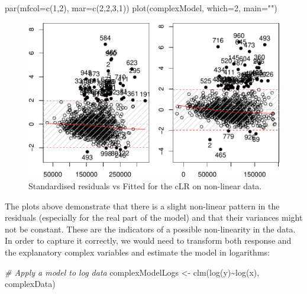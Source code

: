 \documentclass[
]{book}
\newenvironment{Shaded}{\begin{snugshade}}{\end{snugshade}}
\newcommand{\AttributeTok}[1]{\textcolor[rgb]{0.77,0.63,0.00}{#1}}
\newcommand{\CommentTok}[1]{\textcolor[rgb]{0.56,0.35,0.01}{\textit{#1}}}
\newcommand{\DecValTok}[1]{\textcolor[rgb]{0.00,0.00,0.81}{#1}}
\newcommand{\FunctionTok}[1]{\textcolor[rgb]{0.00,0.00,0.00}{#1}}
\newcommand{\NormalTok}[1]{#1}
\newcommand{\OtherTok}[1]{\textcolor[rgb]{0.56,0.35,0.01}{#1}}
\newcommand{\SpecialCharTok}[1]{\textcolor[rgb]{0.00,0.00,0.00}{#1}}
\newcommand{\StringTok}[1]{\textcolor[rgb]{0.31,0.60,0.02}{#1}}
\begin{document}
\begin{Shaded}
\begin{Highlighting}[]
\FunctionTok{par}\NormalTok{(}\AttributeTok{mfcol=}\FunctionTok{c}\NormalTok{(}\DecValTok{1}\NormalTok{,}\DecValTok{2}\NormalTok{), }\AttributeTok{mar=}\FunctionTok{c}\NormalTok{(}\DecValTok{2}\NormalTok{,}\DecValTok{2}\NormalTok{,}\DecValTok{3}\NormalTok{,}\DecValTok{1}\NormalTok{))}
\FunctionTok{plot}\NormalTok{(complexModel, }\AttributeTok{which=}\DecValTok{2}\NormalTok{, }\AttributeTok{main=}\StringTok{""}\NormalTok{)}
\end{Highlighting}
\end{Shaded}

\begin{figure}
\centering
\includegraphics{Svetunkov---Svetunkov---Complex-Valued-Econometrics_files/figure-latex/nonlinearLinStdResid-1.pdf}
\caption{\label{fig:nonlinearLinStdResid}Standardised residuals vs Fitted for the cLR on non-linear data.}
\end{figure}

The plots above demonstrate that there is a slight non-linear pattern in the residuals (especially for the real part of the model) and that their variances might not be constant. These are the indicators of a possible non-linearity in the data. In order to capture it correctly, we would need to transform both response and the explanatory complex variables and estimate the model in logarithms:

\begin{Shaded}
\begin{Highlighting}[]
\CommentTok{\# Apply a model to log data}
\NormalTok{complexModelLogs }\OtherTok{\textless{}{-}} \FunctionTok{clm}\NormalTok{(}\FunctionTok{log}\NormalTok{(y)}\SpecialCharTok{\textasciitilde{}}\FunctionTok{log}\NormalTok{(x), complexData)}
\end{Highlighting}
\end{Shaded}
\end{document}
